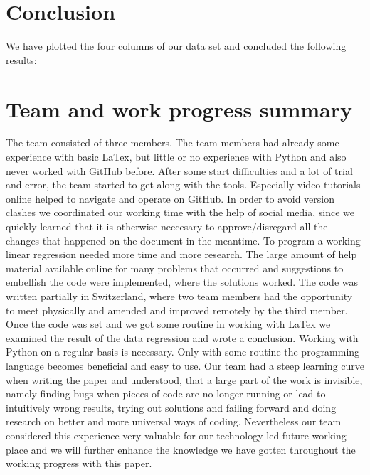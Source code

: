 \documentclass[12pt,a4paper,bibliography=totocnumbered,listof=totocnumbered]{scrartcl}
\begin{document}
\newpage
\section{Conclusion}

We have plotted the four columns of our data set and concluded the following results: 




\section{Team and work progress summary}
The team consisted of three members. The team members had already some experience with basic LaTex, but little or no experience with Python and also never worked with GitHub before. After some start difficulties and a lot of trial and error, the team started to get along with the tools. Especially video tutorials online helped to navigate and operate on GitHub. In order to avoid version clashes we coordinated our working time with the help of social media, since we quickly learned that it is otherwise neccesary to approve/disregard all the changes that happened on the document in the meantime. To program a working linear regression needed more time and more research. The large amount of help material available online for many problems that occurred and suggestions to embellish the code were implemented, where the solutions worked. The code was written partially in Switzerland, where two team members had the opportunity to meet physically and amended and improved remotely by the third member. Once the code was set and we got some routine in working with LaTex we examined the result of the data regression and wrote a conclusion. Working with Python on a regular basis is necessary. Only with some routine the programming language becomes beneficial and easy to use. Our team had a steep learning curve when writing the paper and understood, that a large part of the work is invisible, namely finding bugs when pieces of code are no longer running or lead to intuitively wrong results, trying out solutions and failing forward and doing research on better and more universal ways of coding. Nevertheless our team considered this experience very valuable for our technology-led future working place and we will further enhance the knowledge we have gotten throughout the working progress with this paper.
\end{document}

